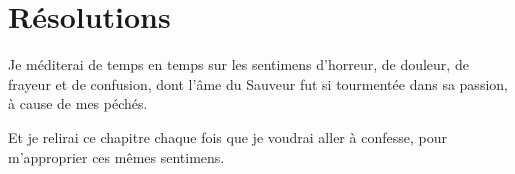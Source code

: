 \documentclass[instructions.tex]{subfiles}
\begin{document}
\section{Résolutions}

\primo Je méditerai de temps en temps sur les sentimens d’horreur, de douleur, de frayeur et de confusion, dont l’âme du Sauveur fut si tourmentée dans sa passion, à cause de mes péchés.  

\secundo Et je relirai ce chapitre chaque fois que je voudrai aller à confesse, pour m’approprier ces mêmes sentimens. 

\end{document}
